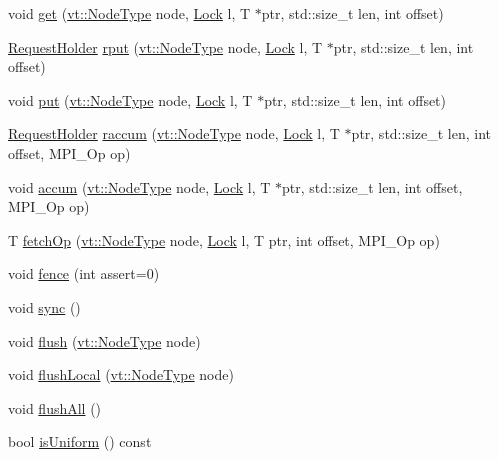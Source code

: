 \begin{DoxyCompactItemize}
\item 
void \hyperlink{structvt_1_1rdma_1_1_holder_a065715e0c91be9b411b490b740fc064a}{get} (\hyperlink{namespacevt_a866da9d0efc19c0a1ce79e9e492f47e2}{vt\+::\+Node\+Type} node, \hyperlink{namespacevt_1_1rdma_ac5c20b41a653e520b6305d4d454ecb70}{Lock} l, T $\ast$ptr, std\+::size\+\_\+t len, int offset)
\item 
\hyperlink{structvt_1_1rdma_1_1_request_holder}{Request\+Holder} \hyperlink{structvt_1_1rdma_1_1_holder_ae3f9105ec3abe794bd39f24ef55f1c29}{rput} (\hyperlink{namespacevt_a866da9d0efc19c0a1ce79e9e492f47e2}{vt\+::\+Node\+Type} node, \hyperlink{namespacevt_1_1rdma_ac5c20b41a653e520b6305d4d454ecb70}{Lock} l, T $\ast$ptr, std\+::size\+\_\+t len, int offset)
\item 
void \hyperlink{structvt_1_1rdma_1_1_holder_ad6edaae632bb4025e8d29f27abfcf81c}{put} (\hyperlink{namespacevt_a866da9d0efc19c0a1ce79e9e492f47e2}{vt\+::\+Node\+Type} node, \hyperlink{namespacevt_1_1rdma_ac5c20b41a653e520b6305d4d454ecb70}{Lock} l, T $\ast$ptr, std\+::size\+\_\+t len, int offset)
\item 
\hyperlink{structvt_1_1rdma_1_1_request_holder}{Request\+Holder} \hyperlink{structvt_1_1rdma_1_1_holder_a1d1abbaaad0d2490b01b10493fe78e36}{raccum} (\hyperlink{namespacevt_a866da9d0efc19c0a1ce79e9e492f47e2}{vt\+::\+Node\+Type} node, \hyperlink{namespacevt_1_1rdma_ac5c20b41a653e520b6305d4d454ecb70}{Lock} l, T $\ast$ptr, std\+::size\+\_\+t len, int offset, M\+P\+I\+\_\+\+Op op)
\item 
void \hyperlink{structvt_1_1rdma_1_1_holder_affd535937b2b5e3bd243e4cae43d779e}{accum} (\hyperlink{namespacevt_a866da9d0efc19c0a1ce79e9e492f47e2}{vt\+::\+Node\+Type} node, \hyperlink{namespacevt_1_1rdma_ac5c20b41a653e520b6305d4d454ecb70}{Lock} l, T $\ast$ptr, std\+::size\+\_\+t len, int offset, M\+P\+I\+\_\+\+Op op)
\item 
T \hyperlink{structvt_1_1rdma_1_1_holder_a21514973be4a2a9107be043fe727d9f0}{fetch\+Op} (\hyperlink{namespacevt_a866da9d0efc19c0a1ce79e9e492f47e2}{vt\+::\+Node\+Type} node, \hyperlink{namespacevt_1_1rdma_ac5c20b41a653e520b6305d4d454ecb70}{Lock} l, T ptr, int offset, M\+P\+I\+\_\+\+Op op)
\item 
void \hyperlink{structvt_1_1rdma_1_1_holder_ae0131450f2f087c80faa444810aa25ed}{fence} (int assert=0)
\item 
void \hyperlink{structvt_1_1rdma_1_1_holder_a85d338b1beb4c041aa477b18c4eaa312}{sync} ()
\item 
void \hyperlink{structvt_1_1rdma_1_1_holder_af2bb524d70bdaa0eaad2a394c0e9b633}{flush} (\hyperlink{namespacevt_a866da9d0efc19c0a1ce79e9e492f47e2}{vt\+::\+Node\+Type} node)
\item 
void \hyperlink{structvt_1_1rdma_1_1_holder_a4b576d334034884d7c72b89310fd4f57}{flush\+Local} (\hyperlink{namespacevt_a866da9d0efc19c0a1ce79e9e492f47e2}{vt\+::\+Node\+Type} node)
\item 
void \hyperlink{structvt_1_1rdma_1_1_holder_a667a140d3db4f68da8af0f9d6533a88a}{flush\+All} ()
\item 
bool \hyperlink{structvt_1_1rdma_1_1_holder_af5a5f41fb16fbf8ee0f7f1b51120cb65}{is\+Uniform} () const
\end{DoxyCompactItemize}
